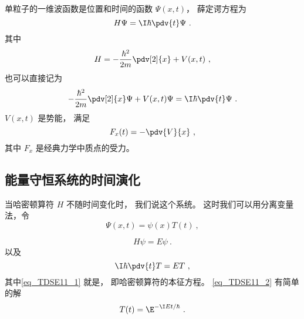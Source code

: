 
\begin{issues}
\issueDraft
\end{issues}


单粒子的一维波函数是位置和时间的函数 $\Psi(x, t)$， 薛定谔方程为
\begin{equation}\label{eq_TDSE11_6}
H\Psi = \I\hbar \pdv{t}\Psi~.
\end{equation}
其中
\begin{equation}
H = -\frac{\hbar^2}{2m}\pdv[2]{x} + V(x, t)~,
\end{equation}
也可以直接记为
\begin{equation}\label{eq_TDSE11_3}
-\frac{\hbar^2}{2m}\pdv[2]{x}\Psi + V(x, t)\Psi = \I\hbar \pdv{t}\Psi~.
\end{equation}
$V(x,t)$ 是势能， 满足
\begin{equation}
F_x(t) = -\pdv{V}{x}~,
\end{equation}
其中 $F_x$ 是经典力学中质点的受力。

\subsection{能量守恒系统的时间演化}
当哈密顿算符 $H$ 不随时间变化时， 我们说这个系统。 这时我们可以用分离变量法，令
\begin{equation}
\Psi(x, t) = \psi(x) T(t)~,
\end{equation}
 
\begin{equation}\label{eq_TDSE11_1}
H\psi = E\psi~.
\end{equation}
以及
\begin{equation}\label{eq_TDSE11_2}
\I \hbar\pdv{t}T = ET~,
\end{equation}
其中\autoref{eq_TDSE11_1} 就是， 即哈密顿算符的本征方程。 \autoref{eq_TDSE11_2} 有简单的解
\begin{equation}
T(t) = \E^{-\I E t/\hbar}~.
\end{equation}

